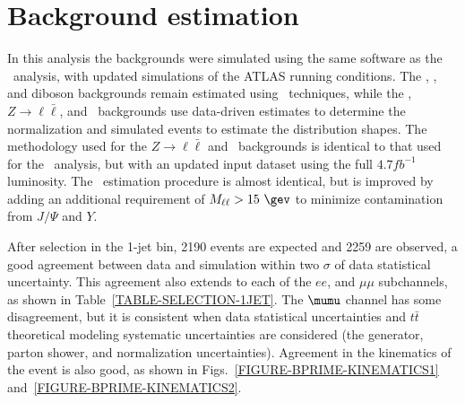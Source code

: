 \section{Background estimation}
\label{SECTION-BPRIME-BACKGROUND}
In this analysis the backgrounds were simulated using the same software as the \Wtchan\ analysis, with updated simulations of the ATLAS running conditions. The \ttbar, \Wt, and diboson backgrounds remain estimated using \MC\ techniques, while the \multijet, $Z \to \ell\bar{\ell}$, and \Ztt\ backgrounds use data-driven estimates to determine the normalization and simulated events to estimate the distribution shapes. The methodology used for the $Z \to \ell\bar{\ell}$ and \Ztt\ backgrounds is identical to that used for the \Wtchan\ analysis, but with an updated input dataset using the full $4.7 fb^{-1}$ luminosity. The \multijet\ estimation procedure is almost identical, but is improved by adding an additional requirement of $M_{\ell\ell}>15~\gev$ to minimize contamination from  $J/\Psi$ and $Y$.

After selection in the 1-jet bin, 2190 events are expected and 2259 are observed, a good agreement between data and simulation within two $\sigma$ of data statistical uncertainty. This agreement also extends to each of the $ee$, and $\mu\mu$ subchannels, as shown in Table~\ref{TABLE-SELECTION-1JET}. The $\mumu$ channel has some disagreement, but it is consistent when data statistical uncertainties and $t\bar{t}$ theoretical modeling systematic uncertainties are considered (the generator, parton shower, and normalization uncertainties). Agreement in the kinematics of the event is also good, as shown in Figs.~\ref{FIGURE-BPRIME-KINEMATICS1} and~\ref{FIGURE-BPRIME-KINEMATICS2}.
 

